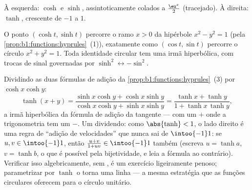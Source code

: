 \begin{omfigure}

{\small À esquerda: $\cosh$ e $\sinh$, assintoticamente colados a
$\frac{\eu^x}{2}$ (tracejado). À direita: $\tanh$, crescente de $-1$ a
$1$.}
\end{omfigure}

\begin{remark}
O ponto $(\cosh t, \sinh t)$ percorre o ramo $x > 0$ da
hipérbole $x^2 - y^2 = 1$ (pela
\cref{prop:b1:functions:hyprules}~(1)), exatamente como $(\cos t, \sin
t)$
percorre o círculo $x^2 + y^2 = 1$. Toda identidade circular tem
uma irmã hiperbólica, com trocas de sinal governadas por
$\sinh^2 \leftrightarrow -\sin^2$.
\end{remark}

\begin{example}\label{ex:b1:functions:tanhadd}
Dividindo as duas fórmulas de adição da
\cref{prop:b1:functions:hyprules}~(3) por $\cosh x\cosh y$:
\[
\tanh(x + y)
= \frac{\sinh x\cosh y + \cosh x\sinh y}
{\cosh x\cosh y + \sinh x\sinh y}
= \frac{\tanh x + \tanh y}{1 + \tanh x\,\tanh y} ,
\]
a irmã hiperbólica da fórmula de adição da tangente --- com um
$+$ onde a trigonometria tem um $-$. Um dividendo: como $\abs{\tanh}
< 1$, o lado direito é uma regra de ``adição de velocidades'' que
nunca sai de $\intoo{-1}1$: se $u, v \in \intoo{-1}1$, então
$\frac{u + v}{1 + uv} \in \intoo{-1}1$ também (escreva $u = \tanh
a$, $v = \tanh b$, o que é possível pela bijetividade, e leia a fórmula
ao contrário). Verificar isso algebricamente, sem , é um exercício ligeiramente penoso; parametrizar por
$\tanh$ o torna uma linha --- a mesma estratégia que as funções
circulares oferecem para o círculo unitário.
\end{example}

